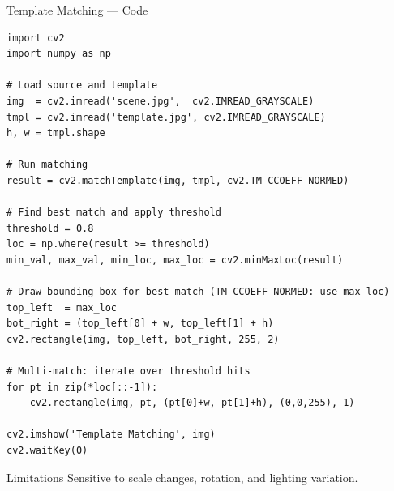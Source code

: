 \documentclass[aspectratio=169]{beamer}
\begin{document}
\begin{frame}[fragile]{Template Matching — Code}
\begin{lstlisting}
import cv2
import numpy as np

# Load source and template
img  = cv2.imread('scene.jpg',  cv2.IMREAD_GRAYSCALE)
tmpl = cv2.imread('template.jpg', cv2.IMREAD_GRAYSCALE)
h, w = tmpl.shape

# Run matching
result = cv2.matchTemplate(img, tmpl, cv2.TM_CCOEFF_NORMED)

# Find best match and apply threshold
threshold = 0.8
loc = np.where(result >= threshold)
min_val, max_val, min_loc, max_loc = cv2.minMaxLoc(result)

# Draw bounding box for best match (TM_CCOEFF_NORMED: use max_loc)
top_left  = max_loc
bot_right = (top_left[0] + w, top_left[1] + h)
cv2.rectangle(img, top_left, bot_right, 255, 2)

# Multi-match: iterate over threshold hits
for pt in zip(*loc[::-1]):
    cv2.rectangle(img, pt, (pt[0]+w, pt[1]+h), (0,0,255), 1)

cv2.imshow('Template Matching', img)
cv2.waitKey(0)
\end{lstlisting}
\begin{block}{Limitations}
  Sensitive to scale changes, rotation, and lighting variation.
\end{block}
\end{frame}
\end{document}
